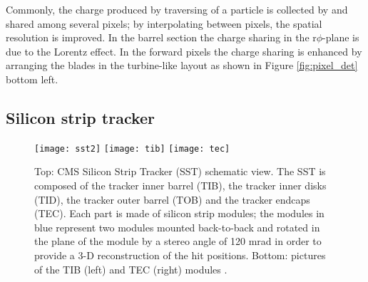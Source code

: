 Commonly, the charge produced by traversing of a particle is collected by and shared among several pixels; by interpolating between pixels, the spatial resolution is improved. In the barrel section the charge sharing in the r$\phi$-plane is due to the Lorentz effect. In the forward pixels the charge sharing is enhanced by arranging the blades in the turbine-like layout as shown in Figure \ref{fig:pixel_det} bottom left.


\subsection{Silicon strip tracker}\label{sst}
\begin{figure}[h!]
  \centering
  \texttt{[image: sst2]}
  \texttt{[image: tib]}
  \texttt{[image: tec]}
  \caption[SST Schematic view.]{Top: CMS Silicon Strip Tracker (SST) schematic view. The SST is composed of the tracker inner barrel (TIB), the tracker inner disks (TID), the tracker outer barrel (TOB) and the tracker endcaps (TEC). Each part is made of silicon strip modules; the modules in blue represent two modules mounted back-to-back and rotated in the plane of the module by a stereo angle of 120 mrad in order to provide a 3-D reconstruction of the hit positions. Bottom: pictures of the TIB (left) and TEC (right) modules \cite{sst,tib,tec}.}
  \label{fig:sst}
\end{figure}

